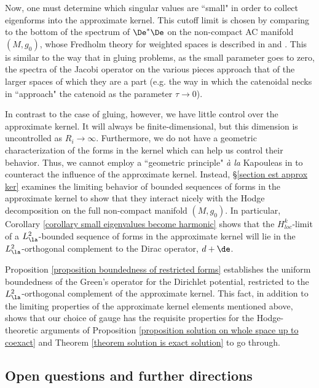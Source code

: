 \documentclass[hidelinks, 12pt, oneside, reqno]{amsart}
\begin{document}
Now, one must determine which singular values are ``small" in order to collect eigenforms into the approximate kernel. This cutoff limit is chosen by comparing to the bottom of the spectrum of $\De^*\De$ on the non-compact AC manifold $(M,g_0)$, whose Fredholm theory for weighted spaces is described in \cite{KarigiannisLotay} and \cite{Lockhart1987}. This is similar to the way that in gluing problems, as the small parameter goes to zero, the spectra of the Jacobi operator on the various pieces approach that of the larger spaces of which they are a part (e.g. the way in which the catenoidal necks in \cite{BreinerKapouleasCMC1} ``approach" the catenoid as the parameter $\tau \rightarrow 0$).

In contrast to the case of gluing, however, we have little control over the approximate kernel. It will always be finite-dimensional, but this dimension is uncontrolled as $R_i \rightarrow \infty$. Furthermore, we do not have a geometric characterization of the forms in the kernel which can help us control their behavior. Thus, we cannot employ a ``geometric principle" \textit{\`{a} la} Kapouleas in \cite{KapouleasCMC1} to counteract the influence of the approximate kernel. Instead, \S \ref{section est approx ker} examines the limiting behavior of bounded sequences of forms in the approximate kernel to show that they interact nicely with the Hodge decomposition on the full non-compact manifold $(M,g_0)$. In particular, Corollary \ref{corollary small eigenvalues become harmonic} shows that the $H^k_{loc}$-limit of a $L^2_\la$-bounded sequence of forms in the approximate kernel will lie in the $L^2_\la$-orthogonal complement to the Dirac operator, $d + \de$. 

Proposition \ref{proposition boundedness of restricted forms} establishes the uniform boundedness of the Green's operator for the Dirichlet potential, restricted to the $L^2_\la$-orthogonal complement of the approximate kernel.  This fact, in addition to the limiting properties of the approximate kernel elements mentioned above, shows that our choice of gauge has the requisite properties for the Hodge-theoretic arguments of Proposition \ref{proposition solution on whole space up to coexact} and Theorem \ref{theorem solution is exact solution} to go through. 


\subsection{Open questions and further directions}
\end{document}
